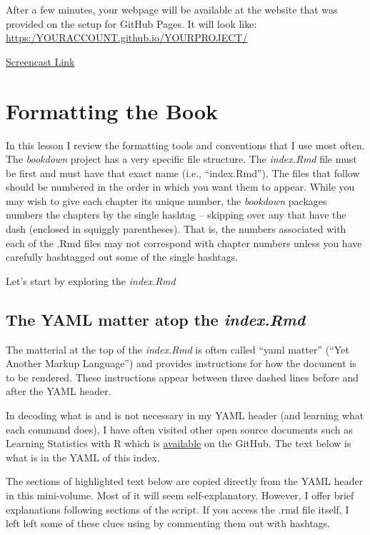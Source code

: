 \documentclass[
]{book}
\begin{document}
After a few minutes, your webpage will be available at the website that was provided on the setup for GitHub Pages. It will look like: \url{https:/YOURACCOUNT.github.io/YOURPROJECT/}

\href{link}{Screencast Link}

\hypertarget{formatting-the-book}{%
\chapter{Formatting the Book}\label{formatting-the-book}}

In this lesson I review the formatting tools and conventions that I use most often. The \emph{bookdown} project has a very specific file structure. The \emph{index.Rmd} file must be first and must have that exact name (i.e., ``index.Rmd''). The files that follow should be numbered in the order in which you want them to appear. While you may wish to give each chapter its unique number, the \emph{bookdown} packages numbers the chapters by the single hashtag -- skipping over any that have the dash (enclosed in squiggly parentheses). That is, the numbers associated with each of the .Rmd files may not correspond with chapter numbers unless you have carefully hashtagged out some of the single hashtags.

Let's start by exploring the \emph{index.Rmd}

\hypertarget{the-yaml-matter-atop-the-index.rmd}{%
\section{\texorpdfstring{The YAML matter atop the \emph{index.Rmd}}{The YAML matter atop the index.Rmd}}\label{the-yaml-matter-atop-the-index.rmd}}

The matterial at the top of the \emph{index.Rmd} is often called ``yaml matter'' (``Yet Another Markup Language'') and provides instructions for how the document is to be rendered. These instructions appear between three dashed lines before and after the YAML header.

In decoding what is and is not necessary in my YAML header (and learning what each command does), I have often visited other open source documents such as Learning Statistics with R \citeyearpar{navarro_book_2020} which is \href{https://github.com/djnavarro/rbook}{available} on the GitHub. The text below is what is in the YAML of this index.

The sections of highlighted text below are copied directly from the YAML header in this mini-volume. Most of it will seem self-explanatory. However, I offer brief explanations following sections of the script. If you access the .rmd file itself, I left left some of these clues using by commenting them out with hashtags.
\end{document}
